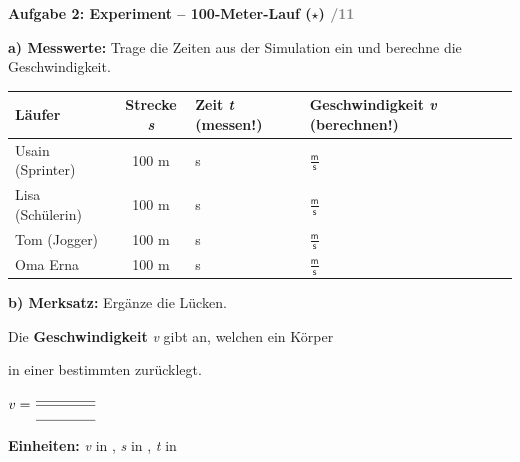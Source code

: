 \documentclass[11pt, a4paper]{article}
\newcommand{\punkte}[1]{\hfill\textcolor{gray}{\small /#1}}
\newcommand{\luecke}[1]{\underline{\hspace{#1}}}
\newcommand{\sternchen}[1]{\textcolor{physik}{\textbf{(#1)}}}
\newcommand{\fz}[1]{\textit{\textrm{#1}}}           %
\newcommand{\einheit}[1]{\textsf{\textup{#1}}}      %
\newcommand{\mps}{$\tfrac{\textsf{m}}{\textsf{s}}$} %
\begin{document}
\vspace{0.8em}


\begin{protokollbox}
\textbf{\textcolor{orange-warn}{Aufgabe 2: Experiment – 100-Meter-Lauf \sternchen{$\star$} \punkte{11}}}

\vspace{0.5em}

\textbf{a) Messwerte:} Trage die Zeiten aus der Simulation ein und berechne die Geschwindigkeit.

\vspace{0.5em}

\renewcommand{\arraystretch}{2.2}
\begin{tabularx}{\textwidth}{|p{2.8cm}|c|>{\centering\arraybackslash}p{2.5cm}|>{\centering\arraybackslash}X|}
\hline
\rowcolor{physik-hell}
\textbf{Läufer} & \textbf{Strecke \fz{s}} & \textbf{Zeit \fz{t}} (messen!) & \textbf{Geschwindigkeit \fz{v}} (berechnen!) \\
\hline
Usain (Sprinter) & 100 \einheit{m} & \einheit{s} & \mps \\
\hline
Lisa (Schülerin) & 100 \einheit{m} & \einheit{s} & \mps \\
\hline
Tom (Jogger) & 100 \einheit{m} & \einheit{s} & \mps \\
\hline
Oma Erna & 100 \einheit{m} & \einheit{s} & \mps \\
\hline
\end{tabularx}

\vspace{0.8em}

\textbf{b) Merksatz:} Ergänze die Lücken.

\vspace{0.3em}

\begin{merkkasten}[Merksatz]
Die \textbf{Geschwindigkeit} \fz{v} gibt an, welchen \luecke{2cm} ein Körper

in einer bestimmten \luecke{2cm} zurücklegt.

\vspace{0.8em}

\begin{center}
{\Large $v = \dfrac{\text{\luecke{1.5cm}}}{\text{\luecke{1.5cm}}}$}
\end{center}

\vspace{0.5em}

\textbf{Einheiten:} \fz{v} in \luecke{1.5cm}, \quad \fz{s} in \luecke{1cm}, \quad \fz{t} in \luecke{1cm}
\end{merkkasten}
\end{protokollbox}
\end{document}
